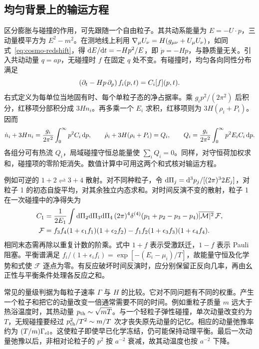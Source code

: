\subsection{均匀背景上的输运方程}\label{sec:cosmo-kinetic-gas}

区分膨胀与碰撞的作用，可先跟随一个自由粒子。其共动系能量为 $E=-U\cdot p$，三动量模平方为 $E^2-m^2$。在测地线上利用 $\nabla_\mu U_\nu=H(g_{\mu\nu}+U_\mu U_\nu)$，如同式~\eqref{eq:cosmo-redshift}，得 $\dd E/\dd t=-Hp^2/E$，即 $\dot p=-Hp$，与静质量无关。引入共动动量 $q=ap$，无碰撞时 $f$ 在固定 $q$ 处不变。有碰撞时，均匀各向同性分布满足
\begin{equation}\label{eq:cosmo-bg-boltz}
 \left(\partial_t-Hp\,\partial_p\right)f_i(p,t)=C_i[f](p,t).
\end{equation}
右式定义为每单位当地固有时、每个单粒子态的净占据率。乘 $g_i p^2/(2\pi^2)$ 后积分，红移项分部积分成 $3Hn_i$。再多乘一个 $E_i$ 求积，红移项则为 $3H(\rho_i+P_i)$。因而
\[
 \dot n_i+3Hn_i=\frac{g_i}{2\pi^2}\int_0^\infty p^2 C_i\,\dd p,\qquad
 \dot\rho_i+3H(\rho_i+P_i)=Q_i,\qquad
 Q_i=\frac{g_i}{2\pi^2}\int_0^\infty p^2 E_i C_i\,\dd p .
\]
各组分可有热流 $Q_i$，局域碰撞守恒总能量使 $\sum_i Q_i=0$。同样，对守恒荷加权求和，碰撞项的零阶矩消失。数值计算中可用这两个和式核对输运方程。

例如可逆的 $1+2\rightleftharpoons3+4$ 散射。对不同种粒子，令 $\dd\Pi_j=\dd^3p_j/[(2\pi)^3 2E_j]$，对粒子 1 的初态自旋平均，对其余独立内态求和。对时间反演不变的散射，粒子 1 在一次碰撞中的净得失为
\[
 \begin{aligned}
 C_1&=\frac{1}{2E_1}\int\dd\Pi_2\dd\Pi_3\dd\Pi_4\,(2\pi)^4
 \delta^{(4)}(p_1+p_2-p_3-p_4)\overline{|{\cal M}|^2}\,{\cal F},\\
 {\cal F}&=f_3 f_4(1+\epsilon_1 f_1)(1+\epsilon_2 f_2)
             - f_1 f_2(1+\epsilon_3 f_3)(1+\epsilon_4 f_4).
 \end{aligned}
\]
相同末态需再除以重复计数的阶乘。式中 $1+f$ 表示受激跃迁，$1-f$ 表示 Pauli 阻塞。平衡谱满足 $f_i/(1+\epsilon_i f_i)=\exp[-(E_i-\mu_i)/T]$，故能量守恒及化学势和式使 $\mathcal F$ 逐点为零。有反应破坏时间反演时，应分别保留正反向几率，再由幺正性与平衡条件处理各反应之和。

常见的量级判据为每粒子速率 $\Gamma$ 与 $H$ 的比较。它对不同问题有不同的权重。产生一个粒子和把它的动量改变一倍通常需要不同的时间。例如重粒子质量 $m$ 远大于热浴温度时，其热动量 $p_{\rm th}\sim\sqrt{mT}$。与一个轻粒子弹性碰撞，单次动量改变约为 $T$，无规碰撞要经过 $p_{\rm th}^2/T^2\sim m/T$ 次才丧失原先动量的记忆。相应的动量弛豫率约为 $(T/m)\Gamma_{\rm el}$。这使粒子即使早已化学冻结，仍可能保持动理平衡。最后一次动量弛豫以后，非相对论粒子的 $p^2$ 按 $a^{-2}$ 衰减，故其动温度也按 $a^{-2}$ 下降。


